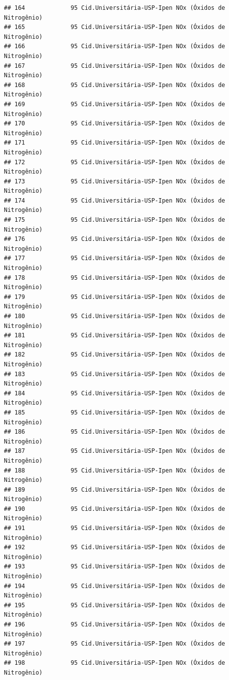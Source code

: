 \documentclass[]{book}
\begin{document}
\begin{verbatim}
## 164             95 Cid.Universitária-USP-Ipen NOx (Óxidos de Nitrogênio)
## 165             95 Cid.Universitária-USP-Ipen NOx (Óxidos de Nitrogênio)
## 166             95 Cid.Universitária-USP-Ipen NOx (Óxidos de Nitrogênio)
## 167             95 Cid.Universitária-USP-Ipen NOx (Óxidos de Nitrogênio)
## 168             95 Cid.Universitária-USP-Ipen NOx (Óxidos de Nitrogênio)
## 169             95 Cid.Universitária-USP-Ipen NOx (Óxidos de Nitrogênio)
## 170             95 Cid.Universitária-USP-Ipen NOx (Óxidos de Nitrogênio)
## 171             95 Cid.Universitária-USP-Ipen NOx (Óxidos de Nitrogênio)
## 172             95 Cid.Universitária-USP-Ipen NOx (Óxidos de Nitrogênio)
## 173             95 Cid.Universitária-USP-Ipen NOx (Óxidos de Nitrogênio)
## 174             95 Cid.Universitária-USP-Ipen NOx (Óxidos de Nitrogênio)
## 175             95 Cid.Universitária-USP-Ipen NOx (Óxidos de Nitrogênio)
## 176             95 Cid.Universitária-USP-Ipen NOx (Óxidos de Nitrogênio)
## 177             95 Cid.Universitária-USP-Ipen NOx (Óxidos de Nitrogênio)
## 178             95 Cid.Universitária-USP-Ipen NOx (Óxidos de Nitrogênio)
## 179             95 Cid.Universitária-USP-Ipen NOx (Óxidos de Nitrogênio)
## 180             95 Cid.Universitária-USP-Ipen NOx (Óxidos de Nitrogênio)
## 181             95 Cid.Universitária-USP-Ipen NOx (Óxidos de Nitrogênio)
## 182             95 Cid.Universitária-USP-Ipen NOx (Óxidos de Nitrogênio)
## 183             95 Cid.Universitária-USP-Ipen NOx (Óxidos de Nitrogênio)
## 184             95 Cid.Universitária-USP-Ipen NOx (Óxidos de Nitrogênio)
## 185             95 Cid.Universitária-USP-Ipen NOx (Óxidos de Nitrogênio)
## 186             95 Cid.Universitária-USP-Ipen NOx (Óxidos de Nitrogênio)
## 187             95 Cid.Universitária-USP-Ipen NOx (Óxidos de Nitrogênio)
## 188             95 Cid.Universitária-USP-Ipen NOx (Óxidos de Nitrogênio)
## 189             95 Cid.Universitária-USP-Ipen NOx (Óxidos de Nitrogênio)
## 190             95 Cid.Universitária-USP-Ipen NOx (Óxidos de Nitrogênio)
## 191             95 Cid.Universitária-USP-Ipen NOx (Óxidos de Nitrogênio)
## 192             95 Cid.Universitária-USP-Ipen NOx (Óxidos de Nitrogênio)
## 193             95 Cid.Universitária-USP-Ipen NOx (Óxidos de Nitrogênio)
## 194             95 Cid.Universitária-USP-Ipen NOx (Óxidos de Nitrogênio)
## 195             95 Cid.Universitária-USP-Ipen NOx (Óxidos de Nitrogênio)
## 196             95 Cid.Universitária-USP-Ipen NOx (Óxidos de Nitrogênio)
## 197             95 Cid.Universitária-USP-Ipen NOx (Óxidos de Nitrogênio)
## 198             95 Cid.Universitária-USP-Ipen NOx (Óxidos de Nitrogênio)

\end{verbatim}
\end{document}
